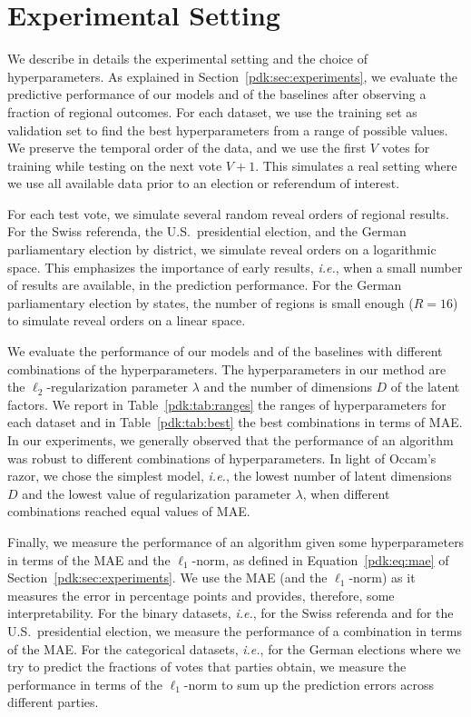 \section{Experimental Setting}
\label{app:experimental_setting}

We describe in details the experimental setting and the choice of hyperparameters.
As explained in Section~\ref{pdk:sec:experiments}, we evaluate the predictive performance of our models and of the baselines after observing a fraction of regional outcomes.
For each dataset, we use the training set as validation set to find the best hyperparameters from a range of possible values.
We preserve the temporal order of the data, and we use the first $V$ votes for training while testing on the next vote $V+1$.
This simulates a real setting where we use all available data prior to an election or referendum of interest.

For each test vote, we simulate several random reveal orders of regional results.
For the Swiss referenda, the U.S.\ presidential election, and the German parliamentary election by district, we simulate reveal orders on a logarithmic space.
This emphasizes the importance of early results, \textit{i.e.}, when a small number of results are available, in the prediction performance.
For the German parliamentary election by states, the number of regions is small enough ($R=16$) to simulate reveal orders on a linear space.

We evaluate the performance of our models and of the baselines with different combinations of the hyperparameters.
The hyperparameters in our method are the $\ell_2$-regularization parameter $\lambda$ and the number of dimensions $D$ of the latent factors.
We report in Table~\ref{pdk:tab:ranges} the ranges of hyperparameters for each dataset and in Table~\ref{pdk:tab:best} the best combinations in terms of MAE.
In our experiments, we generally observed that the performance of an algorithm was robust to different combinations of hyperparameters.
In light of Occam's razor, we chose the simplest model, \textit{i.e.}, the lowest number of latent dimensions $D$ and the lowest value of regularization parameter $\lambda$, when different combinations reached equal values of MAE.

Finally, we measure the performance of an algorithm given some hyperparameters in terms of the MAE and the $\ell_1$-norm, as defined in Equation~\eqref{pdk:eq:mae} of Section~\ref{pdk:sec:experiments}.
We use the MAE (and the $\ell_1$-norm) as it measures the error in percentage points and provides, therefore, some interpretability.
For the binary datasets, \textit{i.e.}, for the Swiss referenda and for the U.S.\ presidential election, we measure the performance of a combination in terms of the MAE.
For the categorical datasets, \textit{i.e.}, for the German elections where we try to predict the fractions of votes that parties obtain, we measure the performance in terms of the $\ell_1$-norm to sum up the prediction errors across different parties.

